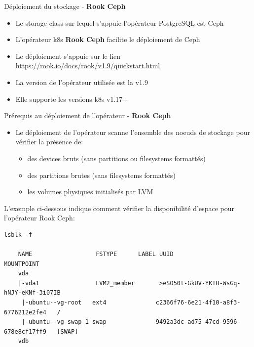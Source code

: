 \begin{frame}[fragile]{Déploiement du stockage - \textbf{Rook Ceph}}

\begin{itemize}
   \item Le storage class sur lequel s'appuie l'opérateur PostgreSQL est Ceph
   \item L'opérateur k8s \textbf{Rook Ceph} facilite le déploiement de Ceph
   \item Le déploiement s'appuie sur le lien \url{https://rook.io/docs/rook/v1.9/quickstart.html}
   \item La version de l'opérateur utilisée est la v1.9
   \item Elle supporte les versions k8s v1.17+
\end{itemize}

\end{frame}


\begin{frame}[fragile]{Prérequis au déploiement de l'opérateur - \textbf{Rook Ceph}}

\begin{itemize}
   \item Le déploiement de l'opérateur scanne l'ensemble des noeuds de stockage pour vérifier la présence de:
   \begin{itemize}
      \item des devices bruts (sans partitions ou filesystems formattés)
      \item des partitions brutes (sans filesystems formattés)
      \item les volumes physiques initialisés par LVM
   \end{itemize}
\end{itemize}

L'exemple ci-dessous indique comment vérifier la disponibilité d'espace pour l'opérateur Rook Ceph:

\begin{tiny}
\begin{Verbatim}[commandchars=\\\{\}]
lsblk -f

    NAME                  FSTYPE      LABEL UUID                                   MOUNTPOINT
    vda
    |-vda1                LVM2_member       >eSO50t-GkUV-YKTH-WsGq-hNJY-eKNf-3i07IB
     |-ubuntu--vg-root   ext4              c2366f76-6e21-4f10-a8f3-6776212e2fe4   /
     |-ubuntu--vg-swap_1 swap              9492a3dc-ad75-47cd-9596-678e8cf17ff9   [SWAP]
    vdb
\end{Verbatim}
\end{tiny}

\end{frame}

